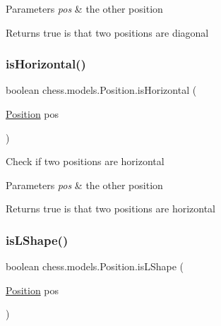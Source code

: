 \begin{DoxyParams}{Parameters}
{\em pos} & the other position \\
\hline
\end{DoxyParams}
\begin{DoxyReturn}{Returns}
true is that two positions are diagonal 
\end{DoxyReturn}
\mbox{\label{classchess_1_1models_1_1_position_a5fdc417a5c9eed00af982d202b505767}} 
\subsubsection{\texorpdfstring{is\+Horizontal()}{isHorizontal()}}
{\footnotesize\ttfamily boolean chess.\+models.\+Position.\+is\+Horizontal (\begin{DoxyParamCaption}\item[{\mbox{\hyperlink{classchess_1_1models_1_1_position}{Position}}}]{pos }\end{DoxyParamCaption})}

Check if two positions are horizontal


\begin{DoxyParams}{Parameters}
{\em pos} & the other position \\
\hline
\end{DoxyParams}
\begin{DoxyReturn}{Returns}
true is that two positions are horizontal 
\end{DoxyReturn}
\mbox{\label{classchess_1_1models_1_1_position_a7e79c1169c4333aa98d6445af82ea5e2}} 
\subsubsection{\texorpdfstring{is\+L\+Shape()}{isLShape()}}
{\footnotesize\ttfamily boolean chess.\+models.\+Position.\+is\+L\+Shape (\begin{DoxyParamCaption}\item[{\mbox{\hyperlink{classchess_1_1models_1_1_position}{Position}}}]{pos }\end{DoxyParamCaption})}

